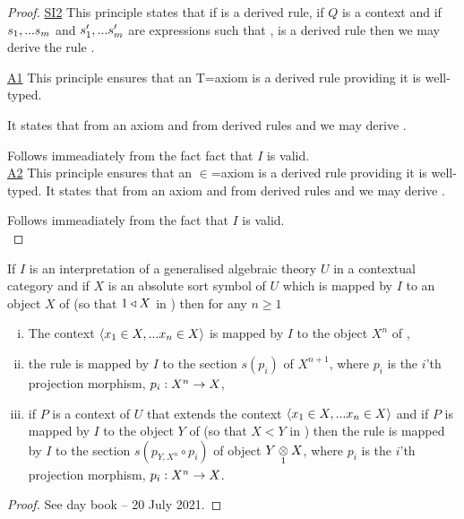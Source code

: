 \begin{proof}
\vspace{1cm}
\underline{SI2} 
This principle states that if  is a derived rule, if $Q$ is a context and if  $\sm$ and $\smp$ are expressions such that
\foreachj,  is a derived rule then we may derive the rule
. \\
\vspace{1cm}

\underline{A1} 
This principle ensures that an T=axiom is a derived rule providing it is well-typed.
 
It states that from an axiom  and from derived rules
  and  we may derive
.

\vspace{1cm}
Follows immeadiately from the fact fact that $I$ is  valid.\\

\underline{A2} 
This principle ensures that an $\in$=axiom is a derived rule providing it is well-typed.
It states that from an axiom  and from derived rules
  and  we may derive
.

\vspace{1cm}
Follows immeadiately from the fact that $I$ is  valid. \\

\end{proof}

\begin{lemma}
If $I$ is an interpretation of a generalised algebraic theory $U$ in a contextual category \catcw and if $X$ is an absolute sort symbol of $U$ which is mapped 
by $I$ to an object $X$ of \catcw (so that $1 \base X$ in \catc) then for any $n \geq 1$ 
\begin{enumerate}[(i)]
\item
The context $\tuple{\ofT{x_1}{X},...\ofT{x_n}{X}}$ is mapped by $I$ to the object $X^n$ of \catc,
\item the rule 
 is mapped by $I$ to the section $s(p_i)$ of $X^{n+1}$, where $p_i$ is the $i$'th projection morphism, $p_i: X^n \morph X$,
\item if $P$ is a context of $U$ that extends the context $\tuple{\ofT{x_1}{X},...\ofT{x_n}{X}}$ and if $P$ is mapped by $I$ to
the object $Y$ of \catcw (so that $X < Y$ in \catc) then the rule 
 is mapped by $I$ to the section $s(p_{Y,X^n}\circ p_i)$ of object $\crossx{Y}{X}{1}$, where $p_i$ is the $i$'th projection morphism, $p_i: X^n \morph X$.
\end{enumerate}
\end{lemma}
\begin{proof}
See day book -- 20 July 2021.
\end{proof}

